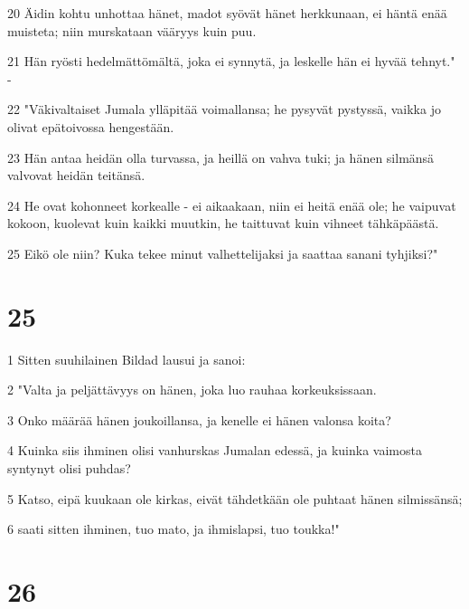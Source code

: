 \par 20 Äidin kohtu unhottaa hänet, madot syövät hänet herkkunaan, ei häntä enää muisteta; niin murskataan vääryys kuin puu.
\par 21 Hän ryösti hedelmättömältä, joka ei synnytä, ja leskelle hän ei hyvää tehnyt." -
\par 22 "Väkivaltaiset Jumala ylläpitää voimallansa; he pysyvät pystyssä, vaikka jo olivat epätoivossa hengestään.
\par 23 Hän antaa heidän olla turvassa, ja heillä on vahva tuki; ja hänen silmänsä valvovat heidän teitänsä.
\par 24 He ovat kohonneet korkealle - ei aikaakaan, niin ei heitä enää ole; he vaipuvat kokoon, kuolevat kuin kaikki muutkin, he taittuvat kuin vihneet tähkäpäästä.
\par 25 Eikö ole niin? Kuka tekee minut valhettelijaksi ja saattaa sanani tyhjiksi?"

\chapter{25}

\par 1 Sitten suuhilainen Bildad lausui ja sanoi:
\par 2 "Valta ja peljättävyys on hänen, joka luo rauhaa korkeuksissaan.
\par 3 Onko määrää hänen joukoillansa, ja kenelle ei hänen valonsa koita?
\par 4 Kuinka siis ihminen olisi vanhurskas Jumalan edessä, ja kuinka vaimosta syntynyt olisi puhdas?
\par 5 Katso, eipä kuukaan ole kirkas, eivät tähdetkään ole puhtaat hänen silmissänsä;
\par 6 saati sitten ihminen, tuo mato, ja ihmislapsi, tuo toukka!"

\chapter{26}

